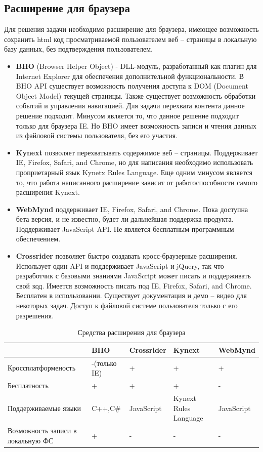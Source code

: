 \documentclass[russian, utf8, emptystyle]{eskdtext}
\begin{document}
\subsection{Расширение для браузера}
Для решения задачи необходимо расширение для браузера, имеющее возможность сохранить html код просматриваемой пользователем веб – страницы в локальную базу данных, без подтверждения пользователем.
\begin{itemize}
	\item {\bf BHO} (Browser Helper Object) - DLL-модуль, разработанный как плагин для Internet Explorer для обеспечения дополнительной функциональности. В BHO API существует возможность получения доступа к DOM (Document Object Model\cite{DOM}) текущей страницы. Также существует возможность обработки событий и управления навигацией. Для задачи перехвата контента данное решение подходит. Минусом является то, что данное решение подходит только для браузера IE. Но BHO имеет возможность записи и чтения данных из файловой системы пользователя, без его участия.
	\item {\bf Kynext} позволяет перехватывать содержимое веб – страницы. Поддерживает IE, Firefox, Safari, and Chrome, но для написания необходимо использовать проприетарный язык Kynetx Rules Language. Еще одним минусом является то, что работа написанного расширение зависит от работоспособности самого расширения Kynext.
	\item {\bf WebMynd} поддерживает  IE, Firefox, Safari, and Chrome. Пока доступна бета версия, и не известно, будет ли дальнейшая поддержка продукта. Поддерживает JavaScript API. Не является бесплатным программным обеспечением.
	\item {\bf Crossrider} позволяет быстро создавать кросс-браузерные расширения. Использует один API и поддерживает JavaScript и jQuery, так что разработчик с базовыми знаниями JavaScript может писать и поддерживать свой код. Имеется возможность писать под IE, Firefox, Safari, and Chrome. Бесплатен в использовании. Существует документация и демо – видео для некоторых задач. Доступ к файловой системе пользователя только с его разрешения. 
\end{itemize}
\begin{table} 
	\caption{Средства расширения для браузера}
	\label{tab:far}
	\begin{center}
		\begin{tabular}{|L{5cm}|L{2cm}|L{2cm}|L{2cm}|L{2cm}|}
			\hline
			& BHO & Crossrider & Kynext & WebMynd \\
			\hline     
			Кроссплатформеность  & -(только IE) & + & + & + \\
			\hline
			Бесплатность & + & + & + & -\\
			\hline
			Поддерживаемые языки & C++,C\# & JavaScript & Kynext Rules Language & JavaScript  \\
			\hline
			Возможность записи в локальную ФС & + & - & - &- \\
			\hline
		\end{tabular}
	\end{center}
\end{table}
\end{document}
